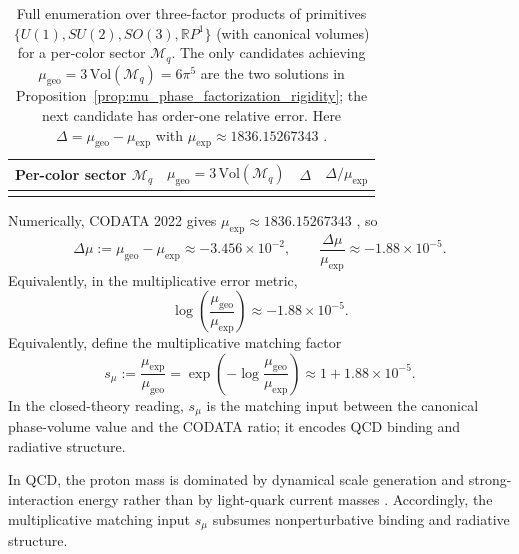 \begin{table}[t]
\centering
\begin{tabular}{@{}lrrr@{}}
\toprule
Per-color sector $\mathcal{M}_q$ & $\mu_{\mathrm{geo}}=3\,\mathrm{Vol}(\mathcal{M}_q)$ & $\Delta$ & $\Delta/\mu_{\mathrm{exp}}$ \\
\midrule
%
\\
\bottomrule
\end{tabular}
\caption{Full enumeration over three-factor products of primitives $\{U(1),SU(2),SO(3),\mathbb{R}P^1\}$ (with canonical volumes) for a per-color sector $\mathcal{M}_q$. The only candidates achieving $\mu_{\mathrm{geo}}=3\,\mathrm{Vol}(\mathcal{M}_q)=6\pi^5$ are the two solutions in Proposition~\ref{prop:mu_phase_factorization_rigidity}; the next candidate has order-one relative error. Here $\Delta=\mu_{\mathrm{geo}}-\mu_{\mathrm{exp}}$ with $\mu_{\mathrm{exp}}\approx 1836.15267343$ \cite{CODATA2022RMP}.}
\label{tab:mu_phase_factorizations}
\end{table}

Numerically, CODATA 2022 gives $\mu_{\mathrm{exp}}\approx 1836.15267343$ \cite{CODATA2022RMP}, so
\begin{equation}
\Delta\mu:=\mu_{\mathrm{geo}}-\mu_{\mathrm{exp}}\approx -3.456\times 10^{-2},
\qquad
\frac{\Delta\mu}{\mu_{\mathrm{exp}}}\approx -1.88\times 10^{-5}.
\end{equation}
Equivalently, in the multiplicative error metric,
\begin{equation}
\log\!\left(\frac{\mu_{\mathrm{geo}}}{\mu_{\mathrm{exp}}}\right)\approx -1.88\times 10^{-5}.
\end{equation}
Equivalently, define the multiplicative matching factor
\begin{equation}
s_\mu:=\frac{\mu_{\mathrm{exp}}}{\mu_{\mathrm{geo}}}=\exp\!\left(-\log\!\frac{\mu_{\mathrm{geo}}}{\mu_{\mathrm{exp}}}\right)\approx 1+1.88\times 10^{-5}.
\end{equation}
In the closed-theory reading, $s_\mu$ is the matching input between the canonical phase-volume value and the CODATA ratio; it encodes QCD binding and radiative structure.

In QCD, the proton mass is dominated by dynamical scale generation and strong-interaction energy rather than by light-quark current masses \cite{Wilczek1999MassWithoutMass,Collins2011,PDGRPP2024}. Accordingly, the multiplicative matching input $s_\mu$ subsumes nonperturbative binding and radiative structure.

